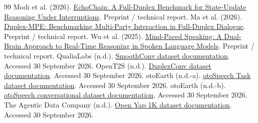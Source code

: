 \begin{thebibliography}{99}
Modi et al. (2026). \href{https://arxiv.org/abs/2604.16456}{EchoChain: A Full-Duplex Benchmark for State-Update Reasoning Under Interruptions}. Preprint / technical report.
Ma et al. (2026). \href{https://arxiv.org/abs/2609.31948}{Duplex-MPE: Benchmarking Multi-Party Interaction in Full-Duplex Dialogue}. Preprint / technical report.
Wu et al. (2025). \href{https://arxiv.org/abs/2510.09592}{Mind-Paced Speaking: A Dual-Brain Approach to Real-Time Reasoning in Spoken Language Models}. Preprint / technical report.
QualiaLabs (n.d.). \href{https://huggingface.co/datasets/qualialabsAI/SmoothConv}{SmoothConv dataset documentation}. Accessed 30 September 2026.
OpenT2S (n.d.). \href{https://huggingface.co/datasets/OpenT2S/DuplexConv}{DuplexConv dataset documentation}. Accessed 30 September 2026.
otoEarth (n.d.-a). \href{https://huggingface.co/datasets/otoearth/otoSpeech-full-duplex-task-oriented-20h}{otoSpeech Task dataset documentation}. Accessed 30 September 2026.
otoEarth (n.d.-b). \href{https://huggingface.co/datasets/otoearth/otoSpeech-full-duplex-processed-141h}{otoSpeech conversational dataset documentation}. Accessed 30 September 2026.
The Agentic Data Company (n.d.). \href{https://github.com/The-Agentic-Data-Co/open-yap-1k}{Open Yap 1K dataset documentation}. Accessed 30 September 2026.
\end{thebibliography}
